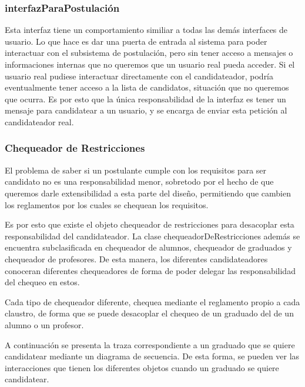 \subsubsection{interfazParaPostulaci\'on}

Esta interfaz tiene un comportamiento similiar a todas las dem\'as interfaces de usuario. Lo que hace es dar una puerta de entrada al sistema para poder interactuar con el subsistema de postulaci\'on, pero sin tener acceso a mensajes o informaciones internas que no queremos que un usuario real pueda acceder. Si el usuario real pudiese interactuar directamente con el candidateador, podr\'ia eventualmente tener acceso a la lista de candidatos, situaci\'on que no queremos que ocurra. Es por esto que la \'unica responsabilidad de la interfaz es tener un mensaje para candidatear a un usuario, y se encarga de enviar esta petici\'on al candidateador real.


\subsubsection{Chequeador de Restricciones}

El problema de saber si un postulante cumple con los requisitos para ser candidato no es una responsabilidad menor, sobretodo por el hecho de que queremos darle extensibilidad a esta parte del diseño, permitiendo que cambien los reglamentos por los cuales se chequean los requisitos.

Es por esto que existe el objeto chequeador de restricciones para desacoplar esta responsabilidad del candidateador. La clase chequeadorDeRestricciones adem\'as se encuentra subclasificada en chequeador de alumnos, chequeador de graduados y chequeador de profesores. De esta manera, los diferentes candidateadores conoceran diferentes chequeadores de forma de poder delegar las responsabilidad del chequeo en estos.

Cada tipo de chequeador diferente, chequea mediante el reglamento propio a cada claustro, de forma que se puede desacoplar el chequeo de un graduado del de un alumno o un profesor.





\bigskip

A continuaci\'on se presenta la traza correspondiente a un graduado que se quiere candidatear mediante un diagrama de secuencia. De esta forma, se pueden ver las interacciones que tienen los diferentes objetos cuando un graduado se quiere candidatear.

